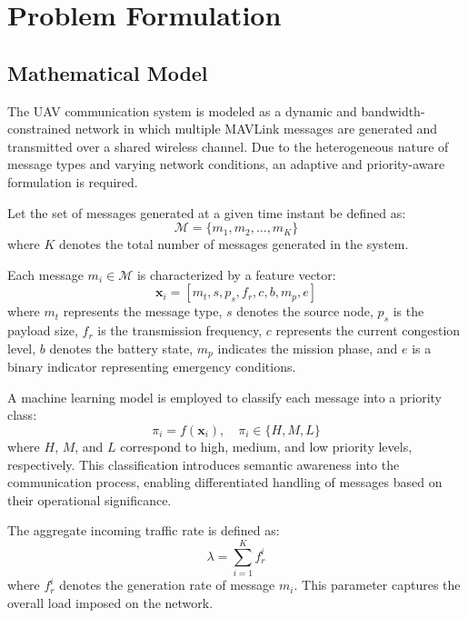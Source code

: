 \documentclass[pdflatex,sn-mathphys-num]{sn-jnl}%
\theoremstyle{thmstyleone}%
\theoremstyle{thmstyletwo}%
\theoremstyle{thmstylethree}%
\begin{document}
\section{ Problem Formulation }

\subsection{ Mathematical Model }

The UAV communication system is modeled as a dynamic and bandwidth-constrained network in which multiple MAVLink messages are generated and transmitted over a shared wireless channel. Due to the heterogeneous nature of message types and varying network conditions, an adaptive and priority-aware formulation is required.

Let the set of messages generated at a given time instant be defined as:
\begin{equation}
\mathcal{M} = \{m_1, m_2, \dots, m_K\}
\label{eq:message_set}
\end{equation}
where $K$ denotes the total number of messages generated in the system.

Each message $m_i \in \mathcal{M}$ is characterized by a feature vector:
\begin{equation}
\mathbf{x}_i = [m_t, s, p_s, f_r, c, b, m_p, e]
\label{eq:feature_vector}
\end{equation}
where $m_t$ represents the message type, $s$ denotes the source node, $p_s$ is the payload size, $f_r$ is the transmission frequency, $c$ represents the current congestion level, $b$ denotes the battery state, $m_p$ indicates the mission phase, and $e$ is a binary indicator representing emergency conditions.

A machine learning model is employed to classify each message into a priority class:
\begin{equation}
\pi_i = f(\mathbf{x}_i), \quad \pi_i \in \{H, M, L\}
\label{eq:priority_mapping}
\end{equation}
where $H$, $M$, and $L$ correspond to high, medium, and low priority levels, respectively. This classification introduces semantic awareness into the communication process, enabling differentiated handling of messages based on their operational significance.

The aggregate incoming traffic rate is defined as:
\begin{equation}
\lambda = \sum_{i=1}^{K} f_r^i
\label{eq:arrival_rate}
\end{equation}
where $f_r^i$ denotes the generation rate of message $m_i$. This parameter captures the overall load imposed on the network.
\end{document}
